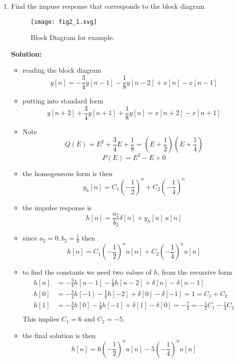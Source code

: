 \documentclass{article}
\begin{document}
\begin{enumerate}
\item Find the impuse response that corresponds to the block diagram

  \begin{figure}
    \centering
    \texttt{[image: fig2\_1.svg]}
    \caption{Block Diagram for example.}
  \end{figure}
  \textbf{Solution:}
  \begin{itemize}
  \item reading the block diagram
    \[
    y[n] = -\frac{3}{4} y[n-1] - \frac{1}{8} y[n-2] + x[n] - x[n-1]
    \]
  \item putting into standard form
    \[
    y[n+2] + \frac{3}{4} y[n+1] + \frac{1}{8} y[n] = x[n+2] - x[n+1]
    \]
  \item Note
    \[
    Q(E) = E^2 + \frac{3}{4}E + \frac{1}{8} = \left(E + \frac{1}{2}\right)\left(E + \frac{1}{4}\right)
    \]
    \[
    P(E) = E^2 - E + 0
    \]
  \item the homogeneous form is then
    \[
    y_h[n] = C_1 \left(-\frac{1}{2}\right)^n + C_2\left(-\frac{1}{4}\right)^n
    \]
  \item the impulse response is
    \[
    h[n] = \frac{a_2}{b_2}\delta[n] + y_h[n]\, u[n]
    \]
  \item since $a_2 = 0, b_2 = \frac{1}{8}$ then
    \[
    h[n] = C_1 \left(-\frac{1}{2}\right)^n u[n] + C_2\left(-\frac{1}{4}\right)^n u[n]
    \]
  \item to find the constants we need two values of $h$, from the recursive form
    \begin{align}
      h[n] &= -\frac{3}{4} h[n-1] - \frac{1}{8} h[n-2] + \delta[n] - \delta[n-1]\\
      h[0] &= -\frac{3}{4} h[-1] - \frac{1}{8} h[-2] + \delta[0] - \delta[-1] = 1 = C_1 + C_2\\
      h[1] &= -\frac{3}{4} h[0] - \frac{1}{8} h[-1] + \delta[1] - \delta[0] = -\frac{7}{4} = -\frac{1}{2} C_1 -\frac{1}{4} C_2\\
    \end{align}
    This implies $C_1 = 6$ and $C_2 = -5$.
  \item the final solution is then
    \[
    h[n] = 6 \left(-\frac{1}{2}\right)^n u[n] -5 \left(-\frac{1}{4}\right)^n u[n]
    \]
    
  \end{itemize}

\end{enumerate}
\end{document}
